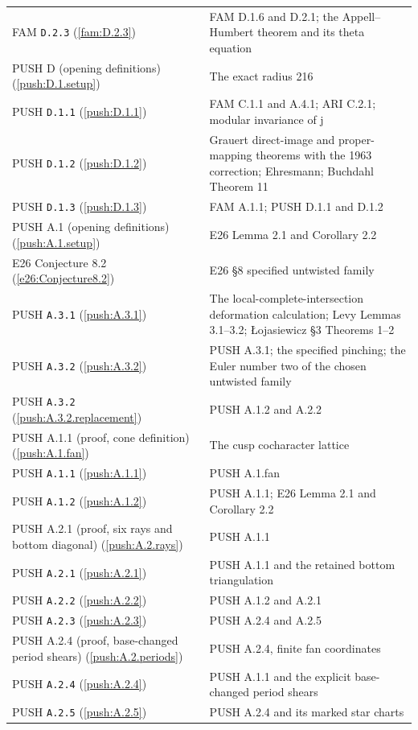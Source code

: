 \begin{longtable}{@{}L{.21\linewidth}L{.73\linewidth}@{}}
FAM \nolinkurl{D.2.3} (\ref{fam:D.2.3}) & FAM D.1.6 and D.2.1; the Appell--Humbert theorem and its theta equation\\
PUSH D (opening definitions) (\ref{push:D.1.setup}) & The exact radius 216\\
PUSH \nolinkurl{D.1.1} (\ref{push:D.1.1}) & FAM C.1.1 and A.4.1; ARI C.2.1; modular invariance of j\\
PUSH \nolinkurl{D.1.2} (\ref{push:D.1.2}) & Grauert direct-image and proper-mapping theorems with the 1963 correction; Ehresmann; Buchdahl Theorem 11\\
PUSH \nolinkurl{D.1.3} (\ref{push:D.1.3}) & FAM A.1.1; PUSH D.1.1 and D.1.2\\
PUSH A.1 (opening definitions) (\ref{push:A.1.setup}) & E26 Lemma 2.1 and Corollary 2.2\\
E26 Conjecture 8.2 (\ref{e26:Conjecture8.2}) & E26 §8 specified untwisted family\\
PUSH \nolinkurl{A.3.1} (\ref{push:A.3.1}) & The local-complete-intersection deformation calculation; Levy Lemmas 3.1--3.2; \L{}ojasiewicz \S3 Theorems 1--2\\
PUSH \nolinkurl{A.3.2} (\ref{push:A.3.2}) & PUSH A.3.1; the specified pinching; the Euler number two of the chosen untwisted family\\
PUSH \nolinkurl{A.3.2} (\ref{push:A.3.2.replacement}) & PUSH A.1.2 and A.2.2\\
PUSH A.1.1 (proof, cone definition) (\ref{push:A.1.fan}) & The cusp cocharacter lattice\\
PUSH \nolinkurl{A.1.1} (\ref{push:A.1.1}) & PUSH A.1.fan\\
PUSH \nolinkurl{A.1.2} (\ref{push:A.1.2}) & PUSH A.1.1; E26 Lemma 2.1 and Corollary 2.2\\
PUSH A.2.1 (proof, six rays and bottom diagonal) (\ref{push:A.2.rays}) & PUSH A.1.1\\
PUSH \nolinkurl{A.2.1} (\ref{push:A.2.1}) & PUSH A.1.1 and the retained bottom triangulation\\
PUSH \nolinkurl{A.2.2} (\ref{push:A.2.2}) & PUSH A.1.2 and A.2.1\\
PUSH \nolinkurl{A.2.3} (\ref{push:A.2.3}) & PUSH A.2.4 and A.2.5\\
PUSH A.2.4 (proof, base-changed period shears) (\ref{push:A.2.periods}) & PUSH A.2.4, finite fan coordinates\\
PUSH \nolinkurl{A.2.4} (\ref{push:A.2.4}) & PUSH A.1.1 and the explicit base-changed period shears\\
PUSH \nolinkurl{A.2.5} (\ref{push:A.2.5}) & PUSH A.2.4 and its marked star charts\\

\end{longtable}
